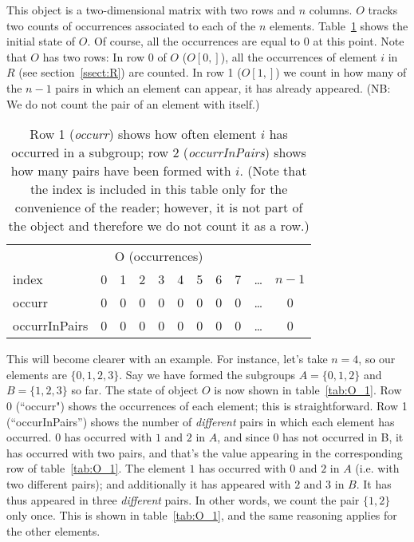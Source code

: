 \documentclass[a4paper]{article}
\begin{document}
This object is a two-dimensional matrix with two rows and $n$ columns.
$O$ tracks two counts of occurrences associated to each of the $n$ elements.
Table~\ref{tab:O_0} shows the initial state of $O$.
Of course, all the occurrences are equal to $0$ at this point.
Note that $O$ has two rows:
In row 0 of $O$ ($O[0,]$), all the occurrences of element $i$ in $R$ (see section~\ref{ssect:R}) are counted.
In row 1 ($O[1,]$) we count in how many of the $n-1$ pairs in which an element can appear, it has already appeared.
(NB: We do not count the pair of an element with itself.)

\begin{table}
\centering
\begin{tabular} {| l ||c |c |c |c |c |c |c |c |c |c |}  
\multicolumn{ 11 }{c}{O (occurrences) } \\  
\multicolumn{1}{l}{index} & \multicolumn{1}{c}{0} & \multicolumn{1}{c}{1} & \multicolumn{1}{c}{2} & \multicolumn{1}{c}{3} & \multicolumn{1}{c}{4} & \multicolumn{1}{c}{5} & \multicolumn{1}{c}{6} & \multicolumn{1}{c}{7} & \multicolumn{1}{c}{\ldots} & \multicolumn{1}{c}{$n-1$} \\ \hline 
occurr & 0 & 0 & 0 & 0 & 0 & 0 & 0 & 0 & \ldots & 0 \\ \hline 
occurrInPairs & 0 & 0 & 0 & 0 & 0 & 0 & 0 & 0 & \ldots & 0 \\ \hline 
\end{tabular}  
\caption{
Row 1 (\emph{occurr}) shows how often element $i$ has occurred in a subgroup;
row 2 (\emph{occurrInPairs}) shows how many pairs have been formed with $i$.
(Note that the index is included in this table only for the convenience of the reader; however, it is not part of the object and therefore we do not count it as a row.)
}
\label{tab:O_0}
\end{table}

This will become clearer with an example.
For instance, let's take $n=4$, so our elements are $\{0,1,2,3\}$.
Say we have formed the subgroups $A=\{0,1,2\}$ and $B=\{1,2,3\}$ so far.
The state of object $O$ is now shown in table~\ref{tab:O_1}.
Row 0 (``occurr") shows the occurrences of each element; this is straightforward.
Row 1 (``occurInPairs'') shows the number of \emph{different} pairs in which each element has occurred.
$0$ has occurred with $1$ and $2$ in $A$, and since $0$ has not occurred in B, it has occurred with two pairs, and that's the value appearing in the corresponding row of table~\ref{tab:O_1}.
The element $1$ has occurred with $0$ and $2$ in $A$ (i.e. with two different pairs); and additionally it has appeared with $2$ and $3$ in $B$.
It has thus appeared in three \emph{different} pairs.
In other words, we count the pair $\{1,2\}$ only once.
This is shown in table~\ref{tab:O_1}, and the same reasoning applies for the other elements.
\end{document}
